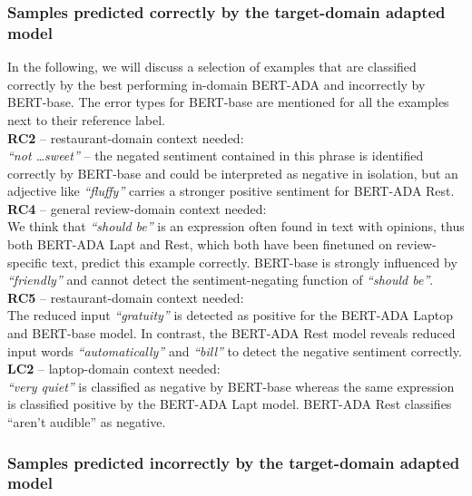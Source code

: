\documentclass[11pt,a4paper]{article}
\begin{document}
\subsubsection*{Samples predicted correctly by the target-domain adapted model}

In the following, we will discuss a selection of examples that are classified correctly by the best performing in-domain BERT-ADA  and incorrectly by BERT-base.
The error types for BERT-base are mentioned for all the examples next to their reference label.
\\
\textbf{RC2} -- restaurant-domain context needed:  \\
\textit{``not \dots sweet''} -- the negated sentiment contained in this phrase is identified correctly by BERT-base and could be interpreted as negative in isolation, but an adjective like \textit{``fluffy''} carries a stronger positive sentiment for BERT-ADA Rest. 
\\
\textbf{RC4} -- general review-domain context needed: \\ 
We think that \textit{``should be''} is an expression often found in text with opinions, thus both BERT-ADA Lapt and Rest, which both have been finetuned on review-specific text, predict this example correctly. BERT-base is strongly influenced by \textit{``friendly''} and cannot detect the sentiment-negating function of \textit{``should be''}. 
\\
\textbf{RC5} -- restaurant-domain context needed: \\ 
The reduced input \textit{``gratuity''} is detected as positive for the BERT-ADA Laptop and BERT-base model. In contrast, the BERT-ADA Rest model reveals reduced input words \textit{``automatically''} and \textit{``bill''} to detect the negative sentiment correctly. 
\\
\textbf{LC2} -- laptop-domain context needed: \\
\textit{``very quiet''} is classified as negative by BERT-base whereas the same expression is classified positive by the BERT-ADA Lapt model. BERT-ADA Rest classifies ``aren't audible'' as negative.

\subsubsection*{Samples predicted incorrectly by the target-domain adapted model}
\end{document}
